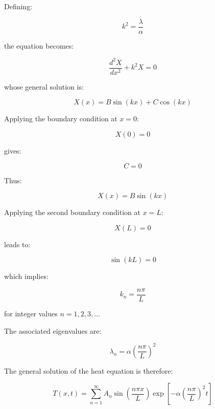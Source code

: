 Defining:

\begin{equation}
k^2=\frac{\lambda}{\alpha}
\end{equation}

the equation becomes:

\begin{equation}
\frac{d^2X}{dx^2}+k^2X=0
\end{equation}

whose general solution is:

\begin{equation}
X(x)=B\sin(kx)+C\cos(kx)
\end{equation}

Applying the boundary condition at $x=0$:

\begin{equation}
X(0)=0
\end{equation}

gives:

\begin{equation}
C=0
\end{equation}

Thus:

\begin{equation}
X(x)=B\sin(kx)
\end{equation}

Applying the second boundary condition at $x=L$:

\begin{equation}
X(L)=0
\end{equation}

leads to:

\begin{equation}
\sin(kL)=0
\end{equation}

which implies:

\begin{equation}
k_n=\frac{n\pi}{L}
\end{equation}

for integer values $n=1,2,3,\dots$

The associated eigenvalues are:

\begin{equation}
\lambda_n
=
\alpha
\left(\frac{n\pi}{L}\right)^2
\end{equation}

The general solution of the heat equation is therefore:

\begin{equation}
T(x,t)
=
\sum_{n=1}^{\infty}
A_n
\sin\left(\frac{n\pi x}{L}\right)
\exp\left[
-\alpha
\left(
\frac{n\pi}{L}
\right)^2
t
\right]
\end{equation}

